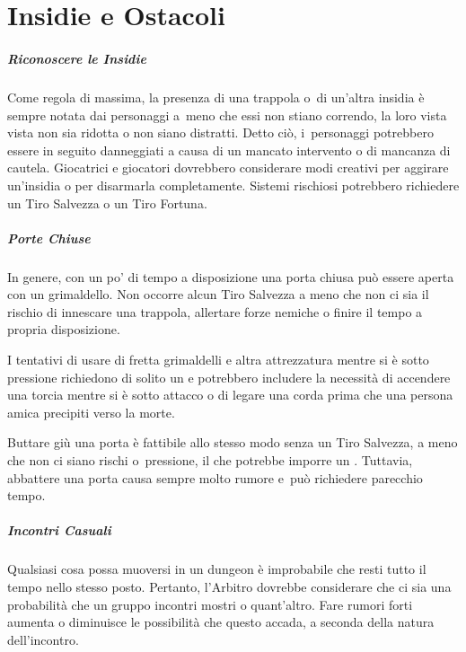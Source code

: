 \documentclass[itdr]{subfiles}
\begin{document}
\chapter{Insidie e Ostacoli}
\label{ch:Insidie_e_ostacoli}

\paragraph{Riconoscere le Insidie}
Come regola di massima, la presenza di una trappola o~di un'altra insidia è sempre notata dai personaggi a~meno che essi non stiano correndo, la loro vista vista non sia ridotta o non siano distratti. Detto ciò, i~personaggi potrebbero essere in seguito danneggiati a causa di un mancato intervento o di mancanza di cautela. Giocatrici e giocatori dovrebbero considerare modi creativi per aggirare un'insidia o per disarmarla completamente. Sistemi rischiosi potrebbero richiedere un Tiro Salvezza o un Tiro Fortuna.

\vfill
\paragraph{Porte Chiuse}
In genere, con un po' di tempo a disposizione una porta chiusa può essere aperta con un grimaldello. Non occorre alcun Tiro Salvezza a meno che non ci sia il rischio di innescare una trappola, allertare forze nemiche o finire il tempo a propria disposizione.

I tentativi di usare di fretta grimaldelli e altra attrezzatura mentre si è sotto pressione richiedono di solito un  e potrebbero includere la necessità di accendere una torcia mentre si è sotto attacco o di legare una corda prima che una persona amica precipiti verso la morte.

Buttare giù una porta è fattibile allo stesso modo senza un Tiro Salvezza, a meno che non ci siano rischi o~pressione, il che potrebbe imporre un . Tuttavia, abbattere una porta causa sempre molto rumore e~può richiedere parecchio tempo.

\vfill
\paragraph{Incontri Casuali}
Qualsiasi cosa possa muoversi in un dungeon è improbabile che resti tutto il tempo nello stesso posto. Pertanto, l'Arbitro dovrebbe considerare che ci sia una probabilità che un gruppo incontri mostri o quant'altro. Fare rumori forti aumenta o diminuisce le possibilità che questo accada, a seconda della natura dell'incontro.
\end{document}
